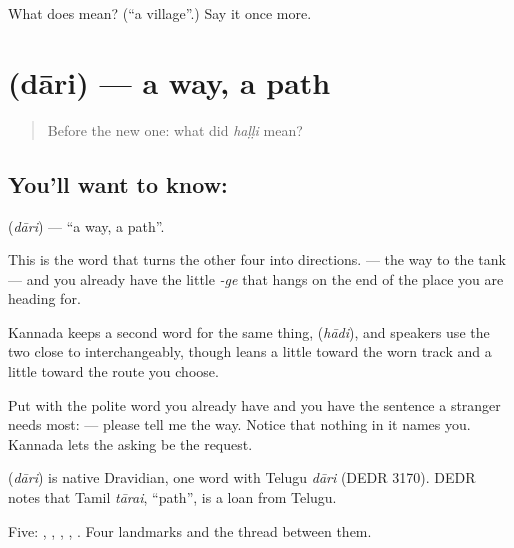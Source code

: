 \begin{tcolorbox}[breakable,colback=teal!4,colframe=teal!35!black,title={Before you move on}]
What does  mean? (\textquotedblleft{}a village\textquotedblright{}.) Say it once more.
\end{tcolorbox}
\section[\texorpdfstring{\kn{ದಾರಿ} (dāri)}{ದಾರಿ (dāri)}]{ (dāri) — a way, a path}

\label{lesson:KA-C55-path}



\begin{quote}
Before the new one: what did \emph{haḷḷi} mean?
\end{quote}

\subsection*{You'll want to know: }
\textbf{} (\emph{dāri}) — \textquotedblleft{}a way, a path\textquotedblright{}.

This is the word that turns the other four into directions.   — the way to the tank — and you already have the little \emph{-ge} that hangs on the end of the place you are heading for.

Kannada keeps a second word for the same thing,  (\emph{hādi}), and speakers use the two close to interchangeably, though  leans a little toward the worn track and  a little toward the route you choose.

Put  with the polite word you already have and you have the sentence a stranger needs most:    — please tell me the way. Notice that nothing in it names you. Kannada lets the asking be the request.

\begin{cousinweb}
\textbf{} (\emph{dāri}) is native Dravidian, one word with Telugu \emph{dāri} (DEDR 3170). DEDR notes that Tamil \emph{tārai}, \textquotedblleft{}path\textquotedblright{}, is a loan from Telugu.
\end{cousinweb}

\begin{grammarlens}[title={What you've built}]
Five: , , , , . Four landmarks and the thread between them.
\end{grammarlens}


